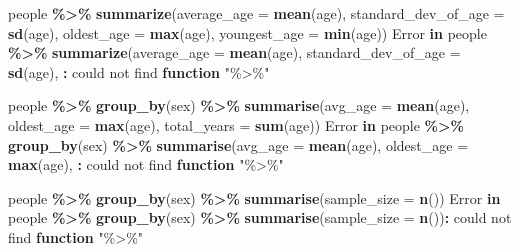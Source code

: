 \documentclass[
]{book}
\newenvironment{Shaded}{\begin{snugshade}}{\end{snugshade}}
\newcommand{\AttributeTok}[1]{\textcolor[rgb]{0.13,0.29,0.53}{#1}}
\newcommand{\ControlFlowTok}[1]{\textcolor[rgb]{0.13,0.29,0.53}{\textbf{#1}}}
\newcommand{\FunctionTok}[1]{\textcolor[rgb]{0.13,0.29,0.53}{\textbf{#1}}}
\newcommand{\NormalTok}[1]{#1}
\newcommand{\SpecialCharTok}[1]{\textcolor[rgb]{0.81,0.36,0.00}{\textbf{#1}}}
\newcommand{\StringTok}[1]{\textcolor[rgb]{0.31,0.60,0.02}{#1}}
\begin{document}
\begin{Shaded}
\begin{Highlighting}[]
\NormalTok{people }\SpecialCharTok{\%\textgreater{}\%} 
  \FunctionTok{summarize}\NormalTok{(}\AttributeTok{average\_age =} \FunctionTok{mean}\NormalTok{(age),}
            \AttributeTok{standard\_dev\_of\_age =} \FunctionTok{sd}\NormalTok{(age),}
            \AttributeTok{oldest\_age =} \FunctionTok{max}\NormalTok{(age),}
            \AttributeTok{youngest\_age =} \FunctionTok{min}\NormalTok{(age))}
\NormalTok{Error }\ControlFlowTok{in}\NormalTok{ people }\SpecialCharTok{\%\textgreater{}\%} \FunctionTok{summarize}\NormalTok{(}\AttributeTok{average\_age =} \FunctionTok{mean}\NormalTok{(age), }\AttributeTok{standard\_dev\_of\_age =} \FunctionTok{sd}\NormalTok{(age), }\SpecialCharTok{:}\NormalTok{ could not find }\ControlFlowTok{function} \StringTok{"\%\textgreater{}\%"}
\end{Highlighting}
\end{Shaded}

\begin{Shaded}
\begin{Highlighting}[]
\NormalTok{people }\SpecialCharTok{\%\textgreater{}\%} 
  \FunctionTok{group\_by}\NormalTok{(sex) }\SpecialCharTok{\%\textgreater{}\%}
  \FunctionTok{summarise}\NormalTok{(}\AttributeTok{avg\_age =} \FunctionTok{mean}\NormalTok{(age),}
            \AttributeTok{oldest\_age =} \FunctionTok{max}\NormalTok{(age),}
            \AttributeTok{total\_years =} \FunctionTok{sum}\NormalTok{(age)) }
\NormalTok{Error }\ControlFlowTok{in}\NormalTok{ people }\SpecialCharTok{\%\textgreater{}\%} \FunctionTok{group\_by}\NormalTok{(sex) }\SpecialCharTok{\%\textgreater{}\%} \FunctionTok{summarise}\NormalTok{(}\AttributeTok{avg\_age =} \FunctionTok{mean}\NormalTok{(age), }\AttributeTok{oldest\_age =} \FunctionTok{max}\NormalTok{(age), }\SpecialCharTok{:}\NormalTok{ could not find }\ControlFlowTok{function} \StringTok{"\%\textgreater{}\%"}
\end{Highlighting}
\end{Shaded}

\begin{Shaded}
\begin{Highlighting}[]
\NormalTok{people }\SpecialCharTok{\%\textgreater{}\%}
  \FunctionTok{group\_by}\NormalTok{(sex) }\SpecialCharTok{\%\textgreater{}\%}
  \FunctionTok{summarise}\NormalTok{(}\AttributeTok{sample\_size =} \FunctionTok{n}\NormalTok{())}
\NormalTok{Error }\ControlFlowTok{in}\NormalTok{ people }\SpecialCharTok{\%\textgreater{}\%} \FunctionTok{group\_by}\NormalTok{(sex) }\SpecialCharTok{\%\textgreater{}\%} \FunctionTok{summarise}\NormalTok{(}\AttributeTok{sample\_size =} \FunctionTok{n}\NormalTok{())}\SpecialCharTok{:}\NormalTok{ could not find }\ControlFlowTok{function} \StringTok{"\%\textgreater{}\%"}
\end{Highlighting}
\end{Shaded}
\end{document}
